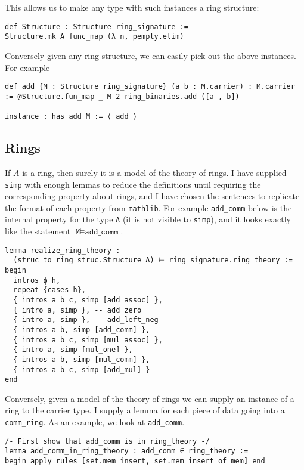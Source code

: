 This allows us to make any type with such instances a ring structure:

\begin{lstlisting}
def Structure : Structure ring_signature :=
Structure.mk A func_map (λ n, pempty.elim)\end{lstlisting}

Conversely given any ring structure,
we can easily pick out the above instances.
For example
\begin{lstlisting}
def add {M : Structure ring_signature} (a b : M.carrier) : M.carrier := @Structure.fun_map _ M 2 ring_binaries.add ([a , b])

instance : has_add M := ⟨ add ⟩\end{lstlisting}

\subsection{Rings}
If $A$ is a ring, then surely it is a model of the theory of rings.
I have supplied \texttt{simp} with enough lemmas to reduce the definitions
until requiring the corresponding property about rings,
and I have chosen the sentences to replicate the format of
each property from \texttt{mathlib}.
For example \texttt{add\_comm} below
is the internal property for the type \texttt{A}
(it is not visible to \texttt{simp}),
and it looks exactly like the statement $\texttt{M} \vDash \texttt{add\_comm}$.

\begin{lstlisting}
lemma realize_ring_theory :
  (struc_to_ring_struc.Structure A) ⊨ ring_signature.ring_theory :=
begin
  intros ϕ h,
  repeat {cases h},
  { intros a b c, simp [add_assoc] },
  { intro a, simp }, -- add_zero
  { intro a, simp }, -- add_left_neg
  { intros a b, simp [add_comm] },
  { intros a b c, simp [mul_assoc] },
  { intro a, simp [mul_one] },
  { intros a b, simp [mul_comm] },
  { intros a b c, simp [add_mul] }
end
\end{lstlisting}

Conversely, given a model of the theory of rings
we can supply an instance of a ring to the carrier type.
I supply a lemma for each piece of data going into a \texttt{comm\_ring}.
As an example, we look at \texttt{add\_comm}.

\begin{lstlisting}
/- First show that add_comm is in ring_theory -/
lemma add_comm_in_ring_theory : add_comm ∈ ring_theory :=
begin apply_rules [set.mem_insert, set.mem_insert_of_mem] end\end{lstlisting}

